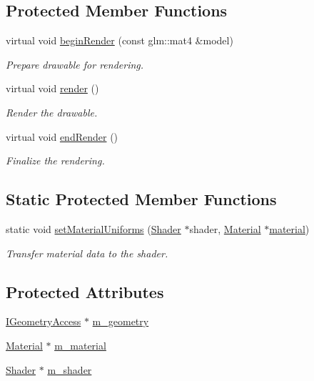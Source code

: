 \subsection*{Protected Member Functions}
\begin{DoxyCompactItemize}
\item 
virtual void \mbox{\hyperlink{classec_1_1_drawable_a9cb72c1eda19a82c849a291e7d45f2b8}{begin\+Render}} (const glm\+::mat4 \&model)
\begin{DoxyCompactList}\small\item\em Prepare drawable for rendering. \end{DoxyCompactList}\item 
virtual void \mbox{\hyperlink{classec_1_1_drawable_a7da17eae29c09e49d1a8c2c48e85f88a}{render}} ()
\begin{DoxyCompactList}\small\item\em Render the drawable. \end{DoxyCompactList}\item 
virtual void \mbox{\hyperlink{classec_1_1_drawable_abf99119cd72054a55d91a7605aa62e32}{end\+Render}} ()
\begin{DoxyCompactList}\small\item\em Finalize the rendering. \end{DoxyCompactList}\end{DoxyCompactItemize}
\subsection*{Static Protected Member Functions}
\begin{DoxyCompactItemize}
\item 
static void \mbox{\hyperlink{classec_1_1_drawable_af2b64f8e6faa71bee8cccb14387d8432}{set\+Material\+Uniforms}} (\mbox{\hyperlink{classec_1_1_shader}{Shader}} $\ast$shader, \mbox{\hyperlink{classec_1_1_material}{Material}} $\ast$\mbox{\hyperlink{_resource_type_8h_a16f6cac2c88eef38bdba4f004e042542}{material}})
\begin{DoxyCompactList}\small\item\em Transfer material data to the shader. \end{DoxyCompactList}\end{DoxyCompactItemize}
\subsection*{Protected Attributes}
\begin{DoxyCompactItemize}
\item 
\mbox{\hyperlink{classec_1_1_i_geometry_access}{I\+Geometry\+Access}} $\ast$ \mbox{\hyperlink{classec_1_1_drawable_a12fc649448250ab8a16e862495d22752}{m\+\_\+geometry}}
\item 
\mbox{\hyperlink{classec_1_1_material}{Material}} $\ast$ \mbox{\hyperlink{classec_1_1_drawable_ae95da71e937a2008a84300b8d29ac052}{m\+\_\+material}}
\item 
\mbox{\hyperlink{classec_1_1_shader}{Shader}} $\ast$ \mbox{\hyperlink{classec_1_1_drawable_aee71f07b65189391a7a465d880d744e3}{m\+\_\+shader}}
\end{DoxyCompactItemize}


